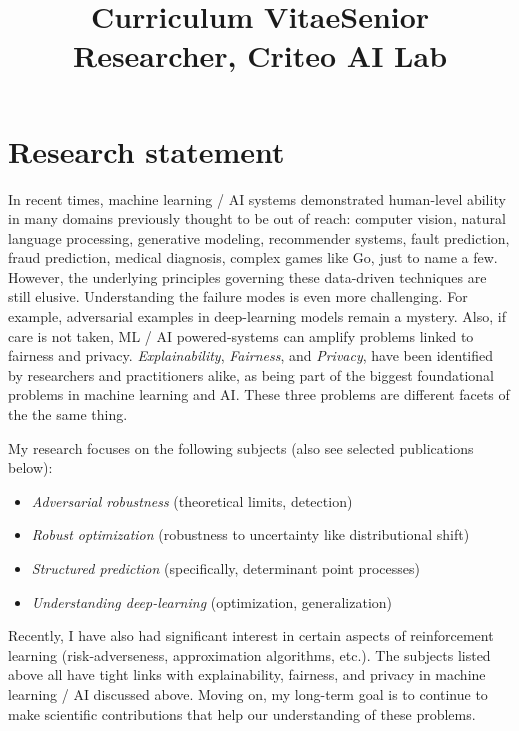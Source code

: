 \documentclass[11pt,a4paper,roman,unicode]{moderncv}
\title{Curriculum Vitae}
\title{Senior Researcher, Criteo AI Lab}
\begin{document}
\maketitle


\section{Research statement}
{In recent times, machine learning / AI systems demonstrated human-level ability in many
  domains previously thought to be out of reach: computer vision, natural
  language processing, generative modeling, recommender systems, fault
  prediction, fraud prediction, medical diagnosis, complex games like Go, just
  to name a few. However, the underlying principles governing these data-driven
  techniques are still elusive. Understanding the failure modes is even more
  challenging. For example, adversarial examples in deep-learning models remain
  a mystery. Also, if care is not taken, ML / AI powered-systems can amplify
  problems linked to fairness and privacy.
  \emph{Explainability}, \emph{Fairness}, and
  \emph{Privacy}, have been identified by researchers and practitioners alike,
  as being part of the biggest foundational problems in machine learning and  AI.
  These three problems are different facets of the the same thing.
}

{My research focuses on the following subjects (also see selected publications below):
  \begin{itemize}
  \item \emph{Adversarial robustness} (theoretical limits, detection)
  \item \emph{Robust optimization} (robustness to uncertainty like
    distributional shift)
  \item \emph{Structured prediction} (specifically, determinant point processes)
  \item \emph{Understanding deep-learning} (optimization, generalization)
  \end{itemize}
  Recently, I have also had significant interest in certain aspects of
  reinforcement learning (risk-adverseness, approximation algorithms, etc.).  
  The subjects listed above all have tight links with explainability,
  fairness, and privacy in machine learning / AI discussed above. 
  Moving on, my long-term goal is to continue to make scientific contributions
  that help our understanding of these problems.
}
\end{document}
